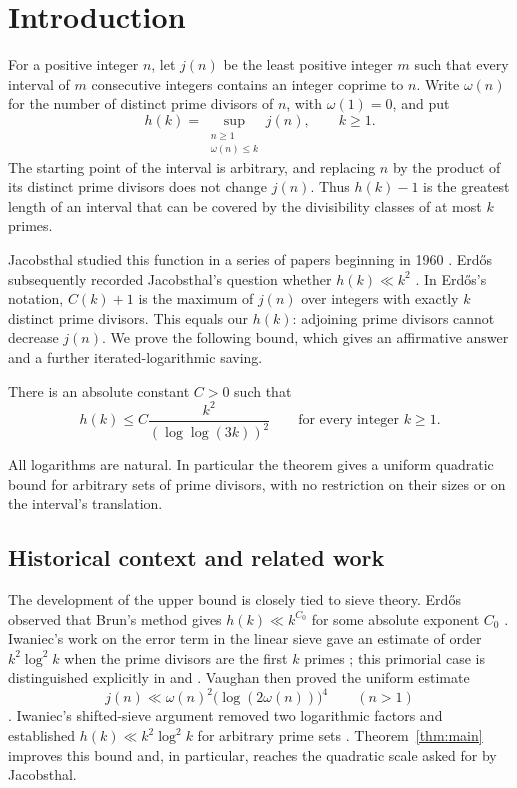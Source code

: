 \section{Introduction}

For a positive integer $n$, let $j(n)$ be the least positive integer $m$
such that every interval of $m$ consecutive integers contains an integer
coprime to $n$. Write $\omega(n)$ for the number of distinct prime divisors
of $n$, with $\omega(1)=0$, and put
\[
 h(k)=\sup_{\substack{n\ge1\\\omega(n)\le k}}j(n),\qquad k\ge1.
\]
The starting point of the interval is arbitrary, and replacing $n$ by
the product of its distinct prime divisors does not change $j(n)$.
Thus $h(k)-1$ is the greatest length of an interval that can be covered
by the divisibility classes of at most $k$ primes.

Jacobsthal studied this function in a series of papers beginning in
1960 \cite{Jacobsthal1960}. Erd\H{o}s subsequently recorded Jacobsthal's question
whether $h(k)\ll k^2$ \cite[p.~163, equations (1) and (3)]{Erdos1962}.
In Erd\H{o}s's notation, $C(k)+1$ is the maximum of $j(n)$ over integers
with exactly $k$ distinct prime divisors. This equals our $h(k)$:
adjoining prime divisors cannot decrease $j(n)$.
We prove the following bound, which gives an affirmative answer and a
further iterated-logarithmic saving.

\begin{theorem}\label{thm:main}
There is an absolute constant $C>0$ such that
\[
 h(k)\le C\frac{k^2}{(\log\log(3k))^2}
 \qquad\text{for every integer }k\ge1.
\]
\end{theorem}

All logarithms are natural. In particular the theorem gives a
uniform quadratic bound for arbitrary sets of prime divisors, with
no restriction on their sizes or on the interval's translation.

\subsection*{Historical context and related work}

The development of the upper bound is closely tied to sieve theory.
Erd\H{o}s observed that Brun's method gives $h(k)\ll k^{C_0}$ for some
absolute exponent $C_0$ \cite[p.~163]{Erdos1962}.
Iwaniec's work on the error term in the linear sieve gave an estimate
of order $k^2\log^2 k$ when the prime divisors are the first $k$ primes
\cite{Iwaniec1971}; this primorial case is distinguished explicitly in
\cite[p.~329]{Vaughan1977} and \cite[pp.~225--226]{Iwaniec1978}.
Vaughan then proved the uniform estimate
\[
 j(n)\ll\omega(n)^2\bigl(\log(2\omega(n))\bigr)^4
 \qquad(n>1)
\]
\cite[Theorem, p.~329]{Vaughan1977}.
Iwaniec's shifted-sieve argument removed two logarithmic factors and
established $h(k)\ll k^2\log^2 k$ for arbitrary prime sets
\cite[Theorem and Corollary, p.~226]{Iwaniec1978}.
Theorem~\ref{thm:main} improves this bound and, in particular, reaches
the quadratic scale asked for by Jacobsthal.

